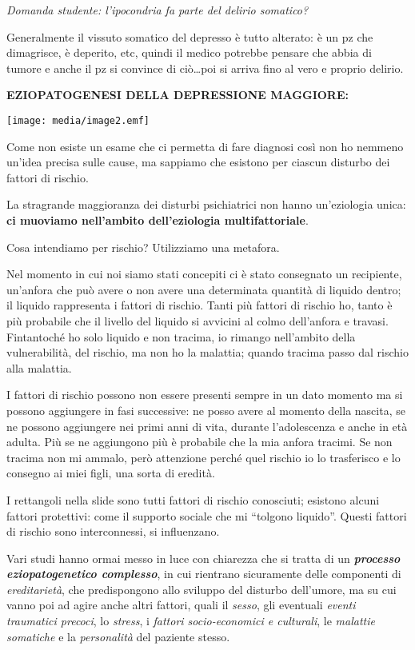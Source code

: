 \documentclass[]{article}
\begin{document}
\emph{Domanda studente: l'ipocondria fa parte del delirio somatico?}

Generalmente il vissuto somatico del depresso è tutto alterato: è un pz
che dimagrisce, è deperito, etc, quindi il medico potrebbe pensare che
abbia di tumore e anche il pz si convince di ciò\ldots{}poi si arriva
fino al vero e proprio delirio.

\textbf{EZIOPATOGENESI DELLA DEPRESSIONE MAGGIORE:}

\texttt{[image: media/image2.emf]}

Come non esiste un esame che ci permetta di fare diagnosi così non ho
nemmeno un'idea precisa sulle cause, ma sappiamo che esistono per
ciascun disturbo dei fattori di rischio.

La stragrande maggioranza dei disturbi psichiatrici non hanno
un'eziologia unica: \textbf{ci muoviamo nell'ambito dell'eziologia
multifattoriale}.

Cosa intendiamo per rischio? Utilizziamo una metafora.

Nel momento in cui noi siamo stati concepiti ci è stato consegnato un
recipiente, un'anfora che può avere o non avere una determinata quantità
di liquido dentro; il liquido rappresenta i fattori di rischio. Tanti
più fattori di rischio ho, tanto è più probabile che il livello del
liquido si avvicini al colmo dell'anfora e travasi. Fintantoché ho solo
liquido e non tracima, io rimango nell'ambito della vulnerabilità, del
rischio, ma non ho la malattia; quando tracima passo dal rischio alla
malattia.

I fattori di rischio possono non essere presenti sempre in un dato
momento ma si possono aggiungere in fasi successive: ne posso avere al
momento della nascita, se ne possono aggiungere nei primi anni di vita,
durante l'adolescenza e anche in età adulta. Più se ne aggiungono più è
probabile che la mia anfora tracimi. Se non tracima non mi ammalo, però
attenzione perché quel rischio io lo trasferisco e lo consegno ai miei
figli, una sorta di eredità.

I rettangoli nella slide sono tutti fattori di rischio conosciuti;
esistono alcuni fattori protettivi: come il supporto sociale che mi
``tolgono liquido''. Questi fattori di rischio sono interconnessi, si
influenzano.

Vari studi hanno ormai messo in luce con chiarezza che si tratta di un
\textbf{\emph{processo eziopatogenetico complesso}}, in cui rientrano
sicuramente delle componenti di \emph{ereditarietà}, che predispongono
allo sviluppo del disturbo dell'umore, ma su cui vanno poi ad agire
anche altri fattori, quali il \emph{sesso}, gli eventuali \emph{eventi
traumatici precoci}, lo \emph{stress}, i \emph{fattori socio-economici e
culturali}, le \emph{malattie somatiche} e la \emph{personalità} del
paziente stesso.
\end{document}
